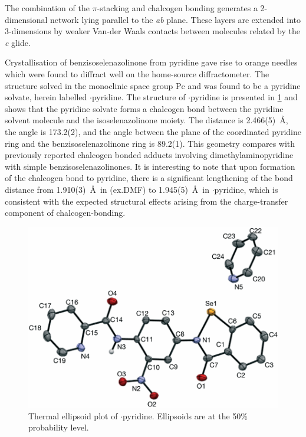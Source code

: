 \begin{refsection}
The combination of the $\pi$-stacking and chalcogen bonding generates a 2-dimension\-al network lying parallel to the \emph{ab} plane.
These layers are extended into 3-dimensions by weaker Van-der Waals contacts between molecules related by the \emph{c} glide.

Crystallisation of benzisoselenazolinone  from pyridine gave rise to orange needles which were found to diffract well on the home-source diffractometer.
The structure solved in the monoclinic space group Pc and was found to be a pyridine solvate, herein labelled $\cdot$pyridine.
The structure of $\cdot$pyridine is presented in \cref{fig:ebs-nitroamide-2py-py-xtal} and shows that the pyridine solvate forms a  chalcogen bond between the pyridine solvent molecule and the isoselenazolinone moiety.
The  distance is 2.466(5)~\AA, the  angle is 173.2(2)\degree, and the angle between the plane of the coordinated pyridine ring and the benzisoselenazolinone ring is 89.2(1)\degree.
This geometry compares with previously reported chalcogen bonded adducts involving dimethylaminopyridine with simple benzisoselenazolinones.\autocite{Fellowes2019}
It is interesting to note that upon formation of the chalcogen bond to pyridine, there is a significant lengthening of the  bond distance from 1.910(3)~\AA~in (ex.DMF) to 1.945(5)~\AA~in $\cdot$pyridine, which is consistent with the expected structural effects arising from the charge-transfer component of chalcogen-bonding.\autocite{Fellowes2019,Pascoe2017}

\begin{figure}
    \centering
    \includegraphics[width=0.8\linewidth]{Figures/ebs-nitroamide-2py-py-xtal.pdf}
    \caption[Thermal ellipsoid plot of $\cdot$pyridine.]{Thermal ellipsoid plot of $\cdot$pyridine. Ellipsoids are at the 50\% probability level.}\label{fig:ebs-nitroamide-2py-py-xtal}
\end{figure}


\end{refsection}
